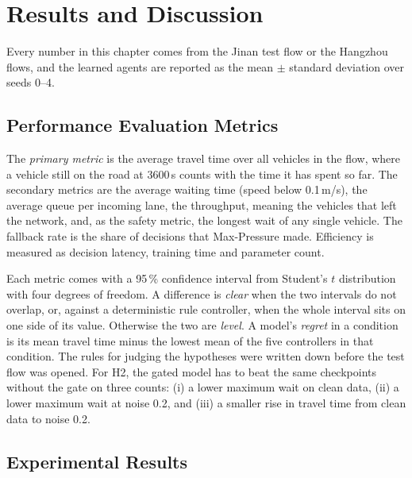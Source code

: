 \chapter{Results and Discussion}
\label{ch:results}

Every number in this chapter comes from the Jinan test flow or the Hangzhou flows, and the
learned agents are reported as the mean $\pm$ standard deviation over seeds 0--4.

\section{Performance Evaluation Metrics}
\label{sec:metrics}

The \emph{primary metric} is the average travel time over all vehicles in the flow, where a
vehicle still on the road at 3600\,s counts with the time it has spent so far. The secondary metrics are
the average waiting time (speed below 0.1\,m/s), the average queue per incoming lane, the
throughput, meaning the vehicles that left the network, and, as the safety metric, the longest
wait of any single vehicle. The fallback rate is the share of \ugmarl{} decisions that
Max-Pressure made. Efficiency is measured as decision latency, training time and parameter
count.

Each metric comes with a 95\,\% confidence interval from Student's $t$ distribution with
four degrees of freedom. A difference is \emph{clear} when the two intervals do not
overlap, or, against a deterministic rule controller, when the whole interval sits on one side
of its value. Otherwise the two are \emph{level}. A model's \emph{regret} in a condition is
its mean travel time minus the lowest mean of the five controllers in that condition. The
rules for judging the hypotheses were written down before the test flow was opened. For H2,
the gated model has to beat the same checkpoints without the gate on three counts: (i) a lower
maximum wait on clean data, (ii) a lower maximum wait at noise 0.2, and (iii) a smaller rise
in travel time from clean data to noise 0.2.

\section{Experimental Results}
\label{sec:results}

\begin{table}[t]
\centering\footnotesize
\setlength{\tabcolsep}{4.2pt}
\caption[Main comparison on the Jinan test flow]{Main comparison on the Jinan test flow with clean detectors (5 seeds; rule
controllers are deterministic). Val.\ = validation travel time, used for selection and
therefore optimistic; Queue in vehicles per lane; Thr.\ = throughput in vehicles; Train =
minutes per run. Bold: lowest test travel time.}
\label{tab:main}

\end{table}

